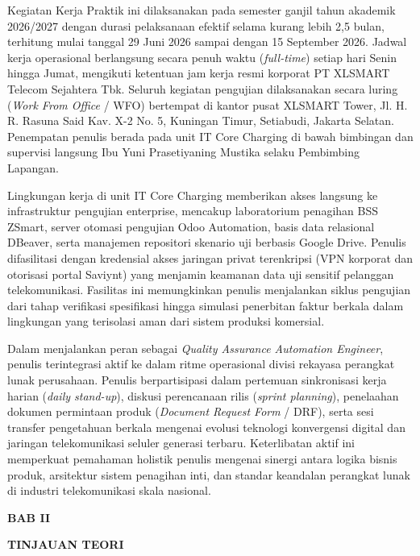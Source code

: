 \documentclass[12pt,a4paper]{article}
\begin{document}
\clearpage
{}
Kegiatan Kerja Praktik ini dilaksanakan pada semester ganjil tahun akademik 2026/2027 dengan durasi pelaksanaan efektif selama kurang lebih 2,5 bulan, terhitung mulai tanggal 29 Juni 2026 sampai dengan 15 September 2026. Jadwal kerja operasional berlangsung secara penuh waktu (\textit{full-time}) setiap hari Senin hingga Jumat, mengikuti ketentuan jam kerja resmi korporat PT XLSMART Telecom Sejahtera Tbk. Seluruh kegiatan pengujian dilaksanakan secara luring (\textit{Work From Office} / WFO) bertempat di kantor pusat XLSMART Tower, Jl. H. R. Rasuna Said Kav. X-2 No. 5, Kuningan Timur, Setiabudi, Jakarta Selatan. Penempatan penulis berada pada unit IT Core Charging di bawah bimbingan dan supervisi langsung Ibu Yuni Prasetiyaning Mustika selaku Pembimbing Lapangan.

Lingkungan kerja di unit IT Core Charging memberikan akses langsung ke infrastruktur pengujian enterprise, mencakup laboratorium penagihan BSS ZSmart, server otomasi pengujian Odoo Automation, basis data relasional DBeaver, serta manajemen repositori skenario uji berbasis Google Drive. Penulis difasilitasi dengan kredensial akses jaringan privat terenkripsi (VPN korporat dan otorisasi portal Saviynt) yang menjamin keamanan data uji sensitif pelanggan telekomunikasi. Fasilitas ini memungkinkan penulis menjalankan siklus pengujian dari tahap verifikasi spesifikasi hingga simulasi penerbitan faktur berkala dalam lingkungan yang terisolasi aman dari sistem produksi komersial.

Dalam menjalankan peran sebagai \textit{Quality Assurance Automation Engineer}, penulis terintegrasi aktif ke dalam ritme operasional divisi rekayasa perangkat lunak perusahaan. Penulis berpartisipasi dalam pertemuan sinkronisasi kerja harian (\textit{daily stand-up}), diskusi perencanaan rilis (\textit{sprint planning}), penelaahan dokumen permintaan produk (\textit{Document Request Form} / DRF), serta sesi transfer pengetahuan berkala mengenai evolusi teknologi konvergensi digital dan jaringan telekomunikasi seluler generasi terbaru. Keterlibatan aktif ini memperkuat pemahaman holistik penulis mengenai sinergi antara logika bisnis produk, arsitektur sistem penagihan inti, dan standar keandalan perangkat lunak di industri telekomunikasi skala nasional.

\clearpage
\begin{center}
    {\bfseries\large BAB II\par}
    {\bfseries\large TINJAUAN TEORI\par}
\end{center}
\vspace{0.4cm}
\end{document}
